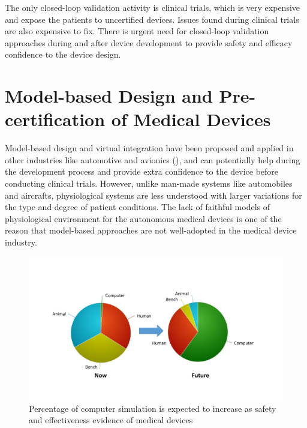 The only closed-loop validation activity is clinical trials, which is very expensive and expose the patients to uncertified devices. 
Issues found during clinical trials are also expensive to fix.
There is urgent need for closed-loop validation approaches during and after device development to provide safety and efficacy confidence to the device design.
\section{Model-based Design and Pre-certification of Medical Devices}
Model-based design and virtual integration have been proposed and applied in other industries like automotive and avionics (\cite{autosar, avsi}), and can potentially help during the development process and provide extra confidence to the device before conducting clinical trials. 
However, unlike man-made systems like automobiles and aircrafts, physiological systems are less understood with larger variations for the type and degree of patient conditions. 
The lack of faithful models of physiological environment for the autonomous medical devices is one of the reason that model-based approaches are not well-adopted in the medical device industry. 
\begin{figure}[t]
		\centering
		\includegraphics[width=\textwidth]{figs/MDIC.pdf}
		\caption{\small Percentage of computer simulation is expected to increase as safety and effectiveness evidence of medical devices}
		\label{fig:MDIC}
\end{figure}

